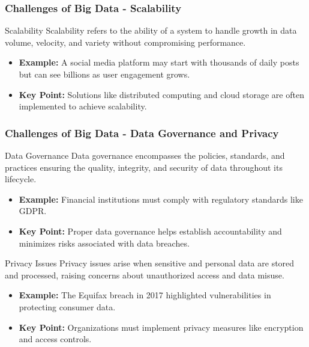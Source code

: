 \documentclass[aspectratio=169]{beamer}
\begin{document}
\begin{frame}[fragile]
    \frametitle{Challenges of Big Data - Scalability}
    \begin{block}{Scalability}
        Scalability refers to the ability of a system to handle growth in data volume, velocity, and variety without compromising performance.
    \end{block}
    \begin{itemize}
        \item \textbf{Example:} A social media platform may start with thousands of daily posts but can see billions as user engagement grows.
        \item \textbf{Key Point:} Solutions like distributed computing and cloud storage are often implemented to achieve scalability.
    \end{itemize}
\end{frame}

\begin{frame}[fragile]
    \frametitle{Challenges of Big Data - Data Governance and Privacy}
    \begin{block}{Data Governance}
        Data governance encompasses the policies, standards, and practices ensuring the quality, integrity, and security of data throughout its lifecycle.
    \end{block}
    \begin{itemize}
        \item \textbf{Example:} Financial institutions must comply with regulatory standards like GDPR.
        \item \textbf{Key Point:} Proper data governance helps establish accountability and minimizes risks associated with data breaches.
    \end{itemize}

    \begin{block}{Privacy Issues}
        Privacy issues arise when sensitive and personal data are stored and processed, raising concerns about unauthorized access and data misuse.
    \end{block}
    \begin{itemize}
        \item \textbf{Example:} The Equifax breach in 2017 highlighted vulnerabilities in protecting consumer data.
        \item \textbf{Key Point:} Organizations must implement privacy measures like encryption and access controls.
    \end{itemize}
\end{frame}
\end{document}
